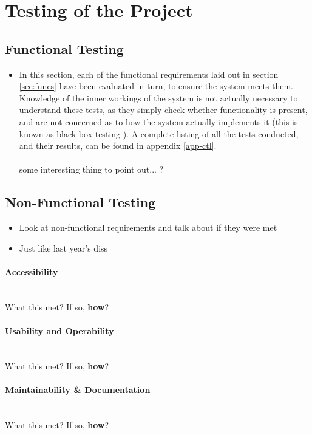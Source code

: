 \section{Testing of the Project}

\subsection{Functional Testing}
{\color{red}
	\begin{itemize}
		\item In this section, each of the functional requirements laid out in section \ref{sec:funcs} have been evaluated in turn, to ensure the system meets them. Knowledge of the inner workings of the system is not actually necessary to understand these tests, as they simply check whether functionality is present, and are not concerned as to how the system actually implements it (this is known as black box testing \cite{beizer1995black}). A complete listing of all the tests conducted, and their results, can be found in appendix \ref{app-ctl}.\ \\
		\ \\
		some interesting thing to point out... ?
	\end{itemize}
}

\subsection{Non-Functional Testing}
{\color{red}
	\begin{itemize}
		\item Look at non-functional requirements and talk about if they were met
		\item Just like last year's diss
	\end{itemize}
}
\paragraph{Accessibility}\ \\
{\color{red} What this met? If so, \textbf{how}?}

\paragraph{Usability and Operability}\ \\
{\color{red} What this met? If so, \textbf{how}?}

\paragraph{Maintainability \& Documentation}\ \\
{\color{red} What this met? If so, \textbf{how}?}

